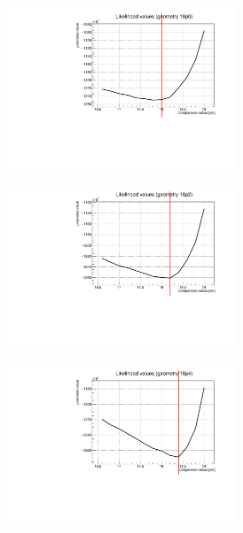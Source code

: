 \documentclass[a4paper, 11pt, twoside, openright]{report}
\begin{document}
\begin{figure}[htbp]
\begin{minipage}[b]{.32\textwidth}
\includegraphics[width=6cm, height=4.6cm]{figs/likelihood100HighStat/likelihood18p0.pdf}
\end{minipage}\hfill
\begin{minipage}[b]{.32\textwidth}
\includegraphics[width=6cm, height=4.6cm]{figs/likelihood100HighStat/likelihood18p2.pdf}
\end{minipage} \hfill
\begin{minipage}[b]{.32\textwidth}
\includegraphics[width=6cm, height=4.6cm]{figs/likelihood100HighStat/likelihood18p4.pdf}
\end{minipage} \hfill \vspace{10pt}


\end{figure}
\end{document}
